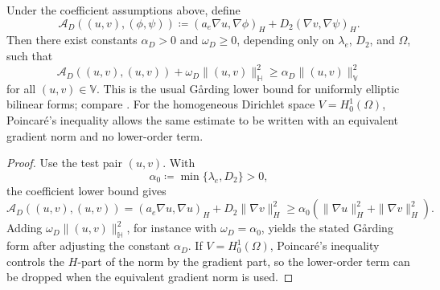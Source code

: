 \begin{lemma}
    \label{lem:app-ch2-rectangular-diffusion-coercivity}
    Under the coefficient assumptions above, define
    \[
        \mathcal{A}_D((u,v),(\phi,\psi))
        \coloneqq
        (a_e\nabla u,\nabla\phi)_H
        +
        D_2(\nabla v,\nabla\psi)_H.
    \]
    Then there exist constants \(\alpha_D>0\) and \(\omega_D\ge0\), depending only on \(\lambda_e\), \(D_2\), and \(\Omega\), such that
    \[
        \mathcal{A}_D((u,v),(u,v))
        +
        \omega_D\|(u,v)\|_{\mathbb{H}}^2
        \ge
        \alpha_D\|(u,v)\|_{\mathbb{V}}^2
    \]
    for all \((u,v)\in\mathbb{V}\). This is the usual G{\aa}rding lower bound for uniformly elliptic bilinear forms; compare \cite[Section~6.2, Theorem~1]{Evans_2010}. For the homogeneous Dirichlet space \(V=H^1_0(\Omega)\), Poincar\'e's inequality \cite[Section~5.8.1, Theorem~1]{Evans_2010} allows the same estimate to be written with an equivalent gradient norm and no lower-order term.
\end{lemma}
\begin{proof}
    Use the test pair \((u,v)\). With
    \[
        \alpha_0\coloneqq\min\{\lambda_e,D_2\}>0,
    \]
    the coefficient lower bound gives
    \[
        \mathcal{A}_D((u,v),(u,v))
        =
        (a_e\nabla u,\nabla u)_H
        +
        D_2\|\nabla v\|_H^2
        \ge
        \alpha_0
        \left(
        \|\nabla u\|_H^2+\|\nabla v\|_H^2
        \right).
    \]
    Adding \(\omega_D\|(u,v)\|_{\mathbb{H}}^2\), for instance with \(\omega_D=\alpha_0\), yields the stated G{\aa}rding form after adjusting the constant \(\alpha_D\). If \(V=H^1_0(\Omega)\), Poincar\'e's inequality controls the \(H\)-part of the norm by the gradient part, so the lower-order term can be dropped when the equivalent gradient norm is used.
\end{proof}


